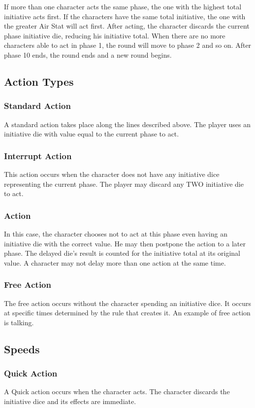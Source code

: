 If more than one character acts the same
phase, the one with the highest total initiative acts
first. If the characters have the same total initiative,
the one with the greater Air Stat will act first. After
acting, the character discards the current phase
initiative die, reducing his initiative total. When
there are no more characters able to act in phase 1,
the round will move to phase 2 and so on. After
phase 10 ends, the round ends and a new round
begins.
\subsection{Action Types}
\subsubsection{Standard Action}
A standard action takes place along the
lines described above. The player uses an initiative
die with value equal to the current phase to act.

\subsubsection{Interrupt Action}
This action occurs when the character
does not have any initiative dice representing the
current phase. The player may discard any TWO
initiative die to act.

\subsubsection{Action}
In this case, the character chooses not to
act at this phase even having an initiative die with
the correct value. He may then postpone the action
to a later phase. The delayed die’s result is counted
for the initiative total at its original value. A
character may not delay more than one action at
the same time.

\subsubsection{Free Action}
The free action occurs without the
character spending an initiative dice. It occurs at
specific times determined by the rule that creates
it. An example of free action is talking.

\subsection{Speeds}
\subsubsection{Quick Action}
A Quick action occurs when the character
acts. The character discards the initiative dice and
its effects are immediate.

